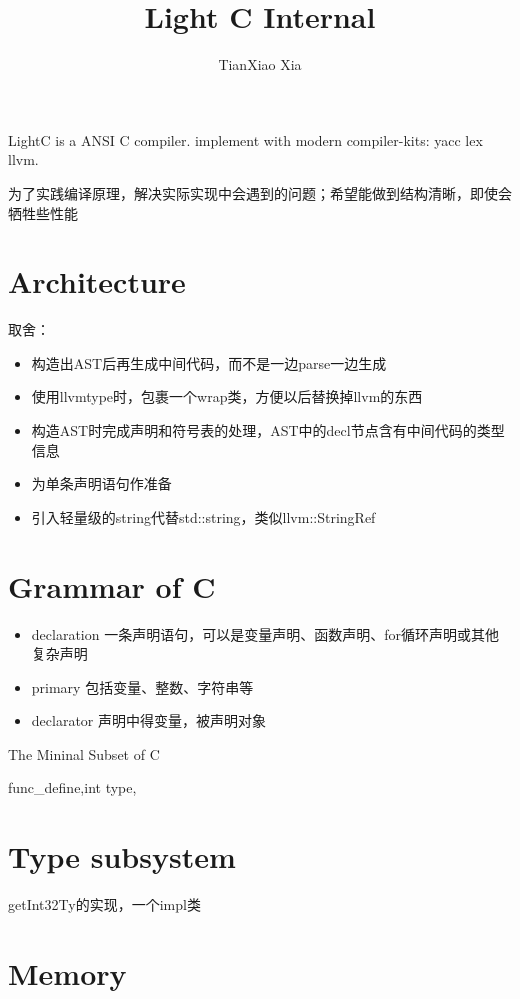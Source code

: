 \documentclass[11pt]{article} %
\title{Light C Internal}
\author{ TianXiao Xia}
\date{} %
\begin{document}
\maketitle
LightC is a ANSI C compiler.  implement with modern compiler-kits: yacc lex llvm. 

为了实践编译原理，解决实际实现中会遇到的问题；希望能做到结构清晰，即使会牺牲些性能

\section{Architecture}


取舍：
\begin{itemize}
\item 构造出AST后再生成中间代码，而不是一边parse一边生成
\item 使用llvmtype时，包裹一个wrap类，方便以后替换掉llvm的东西
\item 构造AST时完成声明和符号表的处理，AST中的decl节点含有中间代码的类型信息
\end{itemize}

\begin{itemize}
\item 为单条声明语句作准备
\end{itemize}

\begin{itemize}
\item 引入轻量级的string代替std::string，类似llvm::StringRef

\end{itemize}
\section{Grammar of C}
\begin{itemize}
\item declaration 一条声明语句，可以是变量声明、函数声明、for循环声明或其他复杂声明
\item primary 包括变量、整数、字符串等
\item declarator 声明中得变量，被声明对象
\end{itemize}

The Mininal Subset of C

func_define,int type,

\section{Type subsystem}
getInt32Ty的实现，一个impl类
\section{Memory}
\end{document}

